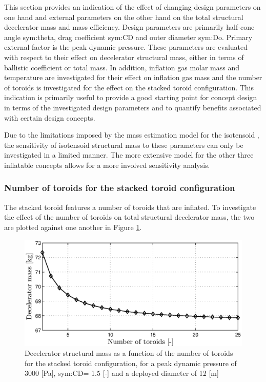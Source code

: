 This section provides an indication of the effect of changing design parameters on one hand and external parameters on the other hand on the total structural decelerator mass and mass efficiency. Design parameters are primarily half-cone angle \gls{sym:theta}, drag coefficient \gls{sym:CD} and outer diameter \gls{sym:Do}. Primary external factor is the peak dynamic pressure. These parameters are evaluated with respect to their effect on decelerator structural mass, either in terms of ballistic coefficient or total mass. In addition, inflation gas molar mass and temperature are investigated for their effect on inflation gas mass and the number of toroids is investigated for the effect on the stacked toroid configuration. This indication is primarily useful to provide a good starting point for concept design in terms of the investigated design parameters and to quantify benefits associated with certain design concepts. 

Due to the limitations imposed by the mass estimation model for the isotensoid \cite{Anderson1969}, the sensitivity of isotensoid structural mass to these parameters can only be investigated in a limited manner. The more extensive model for the other three inflatable concepts \cite{Samareh2011} allows for a more involved sensitivity analysis.


\subsubsection{Number of toroids for the stacked toroid configuration}
The stacked toroid features a number of toroids that are inflated. To investigate the effect of the number of toroids on total structural decelerator mass, the two are plotted against one another in Figure \ref{fig:toro}. 

\begin{figure}[H]
\centering
\includegraphics[width = 1.0\textwidth]{Figure/mass_toroids.eps}
\caption{Decelerator structural mass as a function of the number of toroids for the stacked toroid configuration, for a peak dynamic pressure of 3000 [Pa], \gls{sym:CD}= 1.5 [-] and a deployed diameter of 12 [m]}
\label{fig:toro}
\end{figure}

